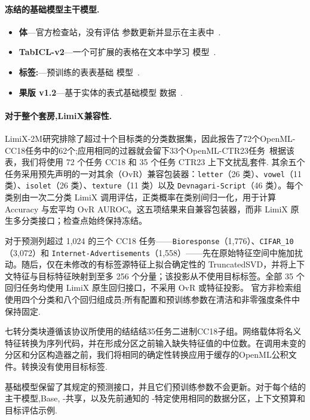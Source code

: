 \paragraph{冻结的基础模型主干模型.}
\begin{itemize}
  \setlength{\itemsep}{1pt}
  \setlength{\parskip}{0pt}
  \item \textbf{体}---官方检查站，没有评估
参数更新并显示在主表中~\citep{wang2026limix2m}. \item \textbf{TabICL-v2}---一个可扩展的表格在文本中学习
模型~\citep{qu2026tabiclv2}.
  \item \textbf{标签:}---预训练的表表基础
模型~\citep{grinsztajn2026tabpfn3technicalreport}.
  \item \textbf{果版 v1.2}---基于实体的表式基础模型
数据~\citep{ma2025tabdpt}.
\end{itemize}

\paragraph{对于整个套房,LimiX兼容性.}LimiX-2M研究排除了超过十个目标类的分类数据集，因此报告了72个OpenML-CC18任务中的62个;应用相同的过器就会留下33个OpenML-CTR23任务~\citep{wang2026limix2m}根据该表，我们将使用 72 个任务 CC18 和 35 个任务 CTR23 上下文扰乱套件.
其余五个任务采用预先声明的一对其余（OvR）兼容包装器：\texttt{letter}（26 类）、\texttt{vowel}（11 类）、\texttt{isolet}（26 类）、\texttt{texture}（11 类）以及 \texttt{Devnagari-Script}（46 类）。每个类别由一次二分类 LimiX 调用评估，正类概率在类别间归一化，用于计算 Accuracy 与宏平均 OvR AUROC。这五项结果来自兼容包装器，而非 LimiX 原生多分类接口；检查点始终保持冻结。

对于预测列超过 1,024 的三个 CC18 任务——\texttt{Bioresponse}（1,776）、\texttt{CIFAR\_10}（3,072）和 \texttt{Internet-Advertisements}（1,558）——先在原始特征空间中施加扰动。随后，仅在未修改的有标签源特征上拟合确定性的 TruncatedSVD，并将上下文特征与目标特征映射到至多 256 个分量；该投影从不使用目标标签。全部 35 个回归任务均使用 LimiX 原生回归接口，不采用 OvR 或特征投影。
官方非检索组使用四个分类和八个回归组成员;所有配置和预训练参数在清洁和非零强度条件中保持固定.

七转分类块遵循该协议所使用的结结结35任务二进制CC18子组。网络载体将名义特征转换为序列代码，并在形成分区之前输入缺失特征值的中位数。在调用未变的分区和分区构造器之前，我们将相同的确定性转换应用于缓存的OpenML公积文件。转换没有使用目标标签.

基础模型保留了其规定的预测接口，并且它们预训练参数不会更新。对于每个结的主干模型,Base, \method{}-共享，以及先前通知的 \method{}-特定使用相同的数据分区，上下文预算和目标评估示例.

